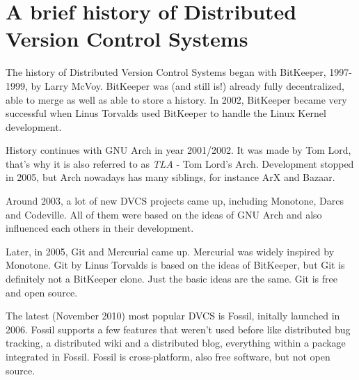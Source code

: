 \section {A brief history of Distributed Version Control Systems} \label{dvcshistory}

The history of Distributed Version Control Systems began with BitKeeper, 1997-1999, by Larry McVoy. BitKeeper was (and still is!) already fully decentralized, able to merge as well as able to store a history. In 2002, BitKeeper became very successful when Linus Torvalds used BitKeeper to handle the Linux Kernel development.

History continues with GNU Arch in year 2001/2002. It was made by Tom Lord, that's why it is also referred to as \emph{TLA} - Tom Lord's Arch. Development stopped in 2005, but Arch nowadays has many siblings, for instance ArX and Bazaar.

Around 2003, a lot of new DVCS projects came up, including Monotone, Darcs and Codeville. All of them were based on the ideas of GNU Arch and also influenced each others in their development.

Later, in 2005, Git and Mercurial came up. Mercurial was widely inspired by Monotone. Git by Linus Torvalds is based on the ideas of BitKeeper, but Git is definitely not a BitKeeper clone. Just the basic ideas are the same. Git is free and open source.

The latest (November 2010) most popular DVCS is Fossil, initally launched in 2006. Fossil supports a few features that weren't used before like distributed bug tracking, a distributed wiki and a distributed blog, everything within a package integrated in Fossil. Fossil is cross-platform, also free software, but not open source.
\cite{understandingvcs} \cite{fossilhomepage}
